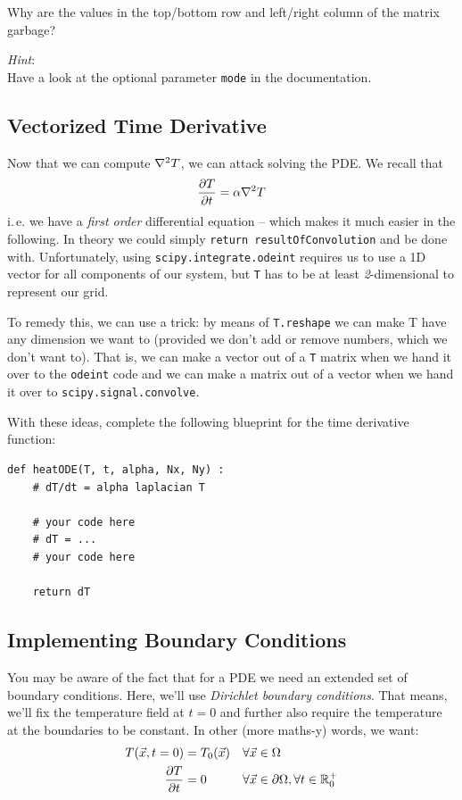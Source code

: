\documentclass[
	english,
	fontsize=10pt,
	parskip=half,
	titlepage=true,
	DIV=12
]{scrartcl}
\newcommand*{\inPy}[1]{\texttt{#1}}
\newcommand*{\ie}{i.\,e. }
\begin{document}
Why are the values in the top/bottom row and left/right column of the matrix garbage?

\emph{Hint}:\\
Have a look at the optional parameter \texttt{mode} in the documentation.

\subsection{Vectorized Time Derivative}
Now that we can compute $\laplacian T$, we can attack solving the PDE. We recall that
\[ \pdv{T}{t} = \alpha \laplacian T \]
\ie we have a \emph{first order} differential equation -- which makes it much easier in the following. In theory we could simply \inPy{return resultOfConvolution} and be done with. Unfortunately, using \texttt{scipy.integrate.odeint} requires us to use a 1D vector for all components of our system, but \texttt{T} has to be at least \emph{2}-dimensional to represent our grid.

To remedy this, we can use a trick: by means of \texttt{T.reshape} we can make T have any dimension we want to (provided we don't add or remove numbers, which we don't want to). That is, we can make a vector out of a \texttt{T} matrix when we hand it over to the \texttt{odeint} code and we can make a matrix out of a vector when we hand it over to \texttt{scipy.signal.convolve}.

With these ideas, complete the following blueprint for the time derivative function:
\begin{verbatim}
def heatODE(T, t, alpha, Nx, Ny) :
    # dT/dt = alpha laplacian T

    # your code here
    # dT = ...
    # your code here
    
    return dT
\end{verbatim}

\subsection{Implementing Boundary Conditions}
You may be aware of the fact that for a PDE we need an extended set of boundary conditions. Here, we'll use \emph{Dirichlet boundary conditions}. That means, we'll fix the temperature field at $t = 0$ and further also require the temperature at the boundaries to be constant. In other (more maths-y) words, we want:
\begin{align*}
	T(\vec{x}, t = 0) &= T_0(\vec{x}) 
	&&
	\forall \vec{x} \in \Omega
\\
	\pdv{T}{t}(\vec{x}) &= 0
	&&
	\forall \vec{x} \in \partial \Omega, \forall t \in \mathbb{R}_{0}^{+}
\end{align*}
\end{document}
